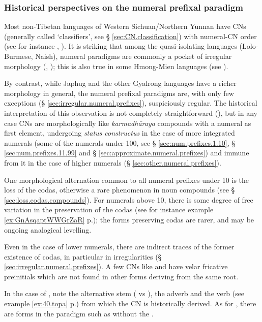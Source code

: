 \subsubsection{Historical perspectives on the numeral prefixal paradigm} \label{sec:num.prefix.paradigm.history}
Most non-Tibetan languages of Western Sichuan/Northern Yunnan have CNs (generally called `classifiers', see § \ref{sec:CN.classification}) with numeral-CN order (see for instance \citealt{zhang14classifiers}, \citealt[163-194]{michaud17yongning}).  It is striking that among the quasi-isolating languages (Lolo-Burmese, Naish), numeral paradigms are commonly a pocket of irregular morphology (\citealt{bradley05numerals}, \citealt{michaud11cl}); this is also true in some Hmong-Mien  languages (see \citealt{gerner10classifier.isolating}).

By contrast, while Japhug and the other Gyalrong languages have a richer morphology in general, the numeral prefixal paradigms are, with only few exceptions (§ \ref{sec:irregular.numeral.prefixes}), suspiciously regular. The historical interpretation of this observation is not completely straightforward (\citealt{jacques17num}), but in any case CNs are morphologically like \textit{karmadhāraya} compounds with a numeral as first element, undergoing \textit{status constructus} in the case of more integrated numerals (some of the numerals under 100, see § \ref{sec:num.prefixes.1.10},  § \ref{sec:num.prefixes.11.99} and § \ref{sec:approximate.numeral.prefixes}) and immune from it in the case of higher numerals (§ \ref{sec:other.numeral.prefixes}).

One morphological alternation common to all numeral prefixes under 10 is the loss of the codas, otherwise a rare phenomenon in noun compounds (see § \ref{sec:loss.codas.compounds}). For numerals above 10, there is some degree of free variation in the preservation of the codas (see for instance example \ref{ex:GnAsqaptWWGrZaR} p.\pageref{ex:GnAsqaptWWGrZaR}); the forms preserving codas are rarer, and may be ongoing analogical levelling.

Even in the case of lower numerals, there are indirect traces of the former existence of codas, in particular in irregularities (§ \ref{sec:irregular.numeral.prefixes}). A few CNs like  and  have velar fricative preinitials  which are not found in other forms deriving from the same root. 

In the case of , note the alternative stem  ( vs ), the adverb  and the verb   (see example \ref{ex:40.topa} p.\pageref{ex:40.topa}) from which the CN  is historically derived. As for , there are forms in the paradigm such as  without the . 


